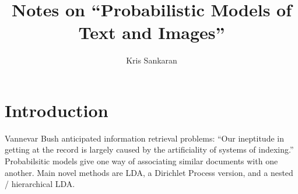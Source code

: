 \documentclass{article}
\title{Notes on ``Probabilistic Models of Text and Images''}}
\author{Kris Sankaran}
\begin{document}
\maketitle

\section{Introduction}

Vannevar Bush anticipated information retrieval problems: ``Our ineptitude in
getting at the record is largely caused by the artificiality of systems of
indexing.'' Probabilsitic models give one way of associating similar documents
with one another. Main novel methods are LDA, a Dirichlet Process version, and a
nested / hierarchical LDA.
\end{document}
